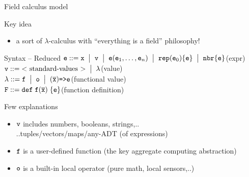\documentclass[presentation, 8pt]{beamer}\mode<presentation>{\usetheme{AMSBolognaFC}}
\begin{document}
\begin{frame}{Field calculus model}
\begin{exampleblock}{Key idea}
	\begin{itemize}
  \item a sort of $\lambda$-calculus with ``everything is a field'' philosophy!
	\end{itemize}
\end{exampleblock}
\begin{alertblock}{Syntax -- Reduced}
	$\texttt{e} \;{\bf ::=}\; \texttt{x} 
	\; \;\bigr\rvert\; \; \texttt{v} 
	\; \;\bigr\rvert\; \; {\texttt{e}} (\texttt{e}_1,\ldots,\texttt{e}_n)
	\;\;\bigr\rvert\; \; \texttt{rep}(\texttt{e}_0)\{\texttt{e}\}
	\; \;\bigr\rvert\; \; \texttt{nbr}\{\texttt{e}\}$\hfill(expr)\\
 $\texttt{v} \;{\bf ::=} \; \textrm{$<$ standard-values $>$} \; \;\bigr\rvert\; \; \lambda $\hfill(value)\\
 $\lambda \;{\bf ::=} \; \texttt{f} \; \;\bigr\rvert\; \; \texttt{o} \; \;\bigr\rvert\; \; (\overline{\texttt{x}})\texttt{=>}\texttt{e}$\hfill(functional value)\\
 $\texttt{F} \;{\bf ::=} \; \texttt{def} \; \texttt{f} (\overline{\texttt{x}}) \; \{\texttt{e}\}$\hfill(function definition)
\end{alertblock}
\begin{exampleblock}{Few explanations}
	\begin{itemize}
	\item $\texttt{v}$ includes numbers, booleans, strings,..\\
	..tuples/vectors/maps/any-ADT (of expressions)
	\item $\texttt{f}$ is a user-defined function (the key aggregate computing abstraction)
	\item $\texttt{o}$ is a built-in local operator (pure math, local sensors,..)
	\end{itemize}
\end{exampleblock}
\end{frame}
\end{document}
